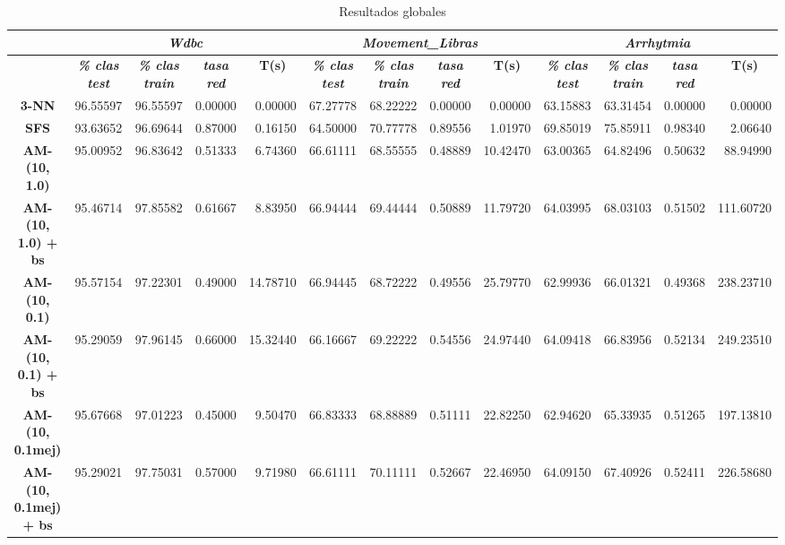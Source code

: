 \documentclass[a4paper,11pt]{article}
\begin{document}
  \begin{table}[H]
  \caption{Resultados globales}
  \begin{adjustbox}{width=1.1\textwidth}
  \begin{tabular}{|c|r|r|r|r|r|r|r|r|r|r|r|r|}
  \hline
  \multicolumn{1}{|l|}{} & \multicolumn{ 4}{c|}{\textbf{\textit{Wdbc}}} & \multicolumn{ 4}{c|}{\textbf{\textit{Movement\_Libras}}} & \multicolumn{ 4}{c|}{\textbf{\textit{Arrhytmia}}} \\ \hline
  \multicolumn{1}{|l|}{} & \multicolumn{1}{c|}{\textbf{\textit{\% clas test}}} & \multicolumn{1}{c|}{\textbf{\textit{\% clas train}}} & \multicolumn{1}{c|}{\textbf{\textit{tasa red}}} & \multicolumn{1}{c|}{\textbf{T(s)}} & \multicolumn{1}{c|}{\textbf{\textit{\% clas test}}} & \multicolumn{1}{c|}{\textbf{\textit{\% clas train}}} & \multicolumn{1}{c|}{\textbf{\textit{tasa red}}} & \multicolumn{1}{c|}{\textbf{T(s)}} & \multicolumn{1}{c|}{\textbf{\textit{\% clas test}}} & \multicolumn{1}{c|}{\textbf{\textit{\% clas train}}} & \multicolumn{1}{c|}{\textbf{\textit{tasa red}}} & \multicolumn{1}{c|}{\textbf{T(s)}} \\ \hline
  \textbf{3-NN} & 96.55597 & 96.55597 & 0.00000 & 0.00000 & 67.27778 & 68.22222 & 0.00000 & 0.00000 & 63.15883 & 63.31454 & 0.00000 & 0.00000 \\ \hline
  \textbf{SFS} & 93.63652 & 96.69644 & 0.87000 & 0.16150 & 64.50000 & 70.77778 & 0.89556 & 1.01970 & 69.85019 & 75.85911 & 0.98340 & 2.06640 \\ \hline
  \textbf{AM-(10, 1.0)} & 95.00952 & 96.83642 & 0.51333 & 6.74360 & 66.61111 & 68.55555 & 0.48889 & 10.42470 & 63.00365 & 64.82496 & 0.50632 & 88.94990 \\ \hline
  \textbf{AM-(10, 1.0) + bs} & 95.46714 & 97.85582 & 0.61667 & 8.83950 & 66.94444 & 69.44444 & 0.50889 & 11.79720 & 64.03995 & 68.03103 & 0.51502 & 111.60720 \\ \hline
  \textbf{AM-(10, 0.1)} & 95.57154 & 97.22301 & 0.49000 & 14.78710 & 66.94445 & 68.72222 & 0.49556 & 25.79770 & 62.99936 & 66.01321 & 0.49368 & 238.23710 \\ \hline
  \textbf{AM-(10, 0.1) + bs} & 95.29059 & 97.96145 & 0.66000 & 15.32440 & 66.16667 & 69.22222 & 0.54556 & 24.97440 & 64.09418 & 66.83956 & 0.52134 & 249.23510 \\ \hline
  \textbf{AM-(10, 0.1mej)} & 95.67668 & 97.01223 & 0.45000 & 9.50470 & 66.83333 & 68.88889 & 0.51111 & 22.82250 & 62.94620 & 65.33935 & 0.51265 & 197.13810 \\ \hline
  \textbf{AM-(10, 0.1mej) + bs} & 95.29021 & 97.75031 & 0.57000 & 9.71980 & 66.61111 & 70.11111 & 0.52667 & 22.46950 & 64.09150 & 67.40926 & 0.52411 & 226.58680 \\ \hline
  \end{tabular}
  \end{adjustbox}
  \label{all}
  \end{table}
  
\end{document}
